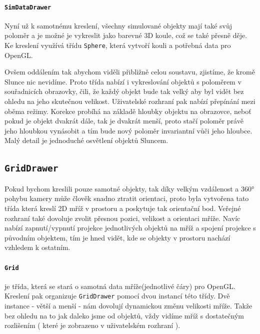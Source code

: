 \paragraph{\texttt{SimDataDrawer}}
Nyní už k samotnému kreslení, všechny simulované objekty mají také svůj poloměr a je možné je vykreslit jako barevné 3D koule, což se také přesně děje. Ke kreslení využívá třídu \texttt{Sphere}, která vytvoří kouli a potřebná data pro OpenGL. 

Ovšem oddálením tak abychom viděli přibližně celou soustavu, zjistíme, že kromě Slunce nic nevidíme. Proto třída nabízí i vykreslování objektů s poloměrem v souřadnicích obrazovky, čili, že každý objekt bude tak velký aby byl vidět bez ohledu na jeho skutečnou velikost. Uživatelské rozhraní pak nabízí přepínání mezi oběma režimy. Korekce probíhá na základě hloubky objektu na obrazovce, neboť pokud je objekt dvakrát dále, tak je dvakrát menší, proto stačí poloměr právě jeho hloubkou vynásobit a tím bude nový poloměr invariantní vůči jeho hloubce. Malý detail je jednoduché osvětlení objektů Sluncem.
\subsection{\texttt{GridDrawer}}
Pokud bychom kreslili pouze samotné objekty, tak díky velkým vzdálenost a 360° pohybu kamery může člověk snadno ztratit orientaci, proto byla vytvořena tato třída která kreslí 2D mříž v prostoru a poskytuje tak orientační bod. Veřejné rozhraní také dovoluje zvolit přesnou pozici, velikost a orientaci mříže. Navíc nabízí zapnutí/vypnutí projekce jednotlivých objektů na mříž a spojení projekce s původním objektem, tím je hned vidět, kde se objekty v prostoru nachází vzhledem k ostatním.

\paragraph{\texttt{Grid}} je třída, která se stará o samotná data mříže(jednotlivé čáry) pro OpenGL. Kreslení pak organizuje \texttt{GridDrawer} pomocí dvou instancí této třídy. Dvě instance - větší a menší - nám dovolují dynamickou změnu velikosti mříže. Takže bez ohledu na to jak daleko jsme od objektů, vždy vidíme mříž s dostatečným rozlišením ( které je zobrazeno v uživatelském rozhraní ). 

